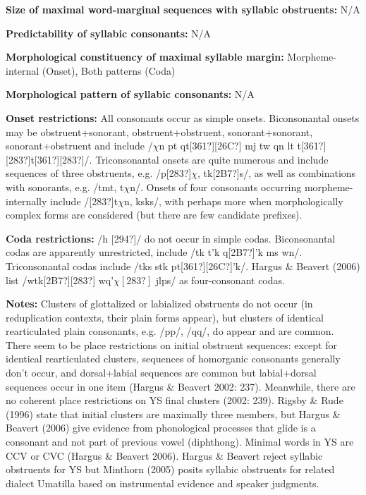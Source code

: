 \begin{styleBody}
\textbf{Size of maximal word{}-marginal sequences with syllabic obstruents:} N/A
\end{styleBody}

\begin{styleBody}
\textbf{Predictability of syllabic consonants:} N/A
\end{styleBody}

\begin{styleBody}
\textbf{Morphological constituency of maximal syllable margin:} Morpheme-internal (Onset), Both patterns (Coda)
\end{styleBody}

\begin{styleBody}
\textbf{Morphological pattern of syllabic consonants:} N/A
\end{styleBody}

\begin{styleBody}
\textbf{Onset restrictions:} All consonants occur as simple onsets. Biconsonantal onsets may be obstruent+sonorant, obstruent+obstruent, sonorant+sonorant, sonorant+obstruent and include /$\chi $n pt qt[361?][26C?] mj tw qn lt t[361?][283?]t[361?][283?]/. Triconsonantal onsets are quite numerous and include sequences of three obstruents, e.g. /p[283?]$\chi $, tk[2B7?]s/, as well as combinations with sonorants, e.g. /tmt, t$\chi $n/. Onsets of four consonants occurring morpheme-internally include /[283?]t$\chi $n, ksks/, with perhaps more when morphologically complex forms are considered (but there are few candidate prefixes).
\end{styleBody}

\begin{styleBody}
\textbf{Coda restrictions:} /h [294?]/ do not occur in simple codas. Biconsonantal codas are apparently unrestricted, include /tk t’k q[2B7?]'k ms wn/. Triconsonantal codas include /tks stk pt[361?][26C?]’k/. Hargus \& Beavert (2006) list /wtk[2B7?][283?] wq’$\chi [283?]$ jlps/ as four-consonant codas.
\end{styleBody}

\begin{styleBody}
\textbf{Notes: }Clusters of glottalized or labialized obstruents do not occur (in reduplication contexts, their plain forms appear), but clusters of identical rearticulated plain consonants, e.g. /pp/, /qq/, do appear and are common. There seem to be place restrictions on initial obstruent sequences: except for identical rearticulated clusters, sequences of homorganic consonants generally don’t occur, and dorsal+labial sequences are common but labial+dorsal sequences occur in one item (Hargus \& Beavert 2002: 237). Meanwhile, there are no coherent place restrictions on YS final clusters (2002: 239). Rigsby \& Rude (1996) state that initial clusters are maximally three members, but Hargus \& Beavert (2006) give evidence from phonological processes that glide is a consonant and not part of previous vowel (diphthong). Minimal words in YS are CCV or CVC (Hargus \& Beavert 2006). Hargus \& Beavert reject syllabic obstruents for YS but Minthorn (2005) posits syllabic obstruents for related dialect Umatilla based on instrumental evidence and speaker judgments.
\end{styleBody}

